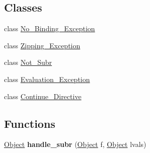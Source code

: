 \subsection*{Classes}
\begin{DoxyCompactItemize}
\item 
class \hyperlink{classNo__Binding__Exception}{No\-\_\-\-Binding\-\_\-\-Exception}
\item 
class \hyperlink{classZipping__Exception}{Zipping\-\_\-\-Exception}
\item 
class \hyperlink{classNot__Subr}{Not\-\_\-\-Subr}
\item 
class \hyperlink{classEvaluation__Exception}{Evaluation\-\_\-\-Exception}
\item 
class \hyperlink{classContinue__Directive}{Continue\-\_\-\-Directive}
\end{DoxyCompactItemize}
\subsection*{Functions}
\begin{DoxyCompactItemize}
\item 
\hypertarget{exception_8hh_adc077f8b90a845a1979dc5bfcffbef41}{\hyperlink{classCell}{Object} {\bfseries handle\-\_\-subr} (\hyperlink{classCell}{Object} f, \hyperlink{classCell}{Object} lvals)}\label{exception_8hh_adc077f8b90a845a1979dc5bfcffbef41}

\end{DoxyCompactItemize}
